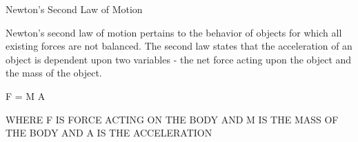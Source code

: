Newton's Second Law of Motion


Newton's second law of motion pertains to the behavior of objects for which all existing forces are not balanced. The second law states that the acceleration of an object is dependent upon two variables - the net force acting upon the object and the mass of the object. 


   F = M A 


WHERE F IS FORCE ACTING ON THE BODY AND M IS THE MASS OF THE BODY AND A IS THE ACCELERATION
